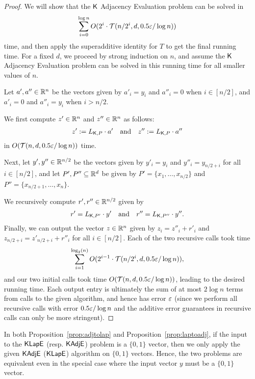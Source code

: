 \begin{proof}
We will show that the $\mathsf{K}$ Adjacency Evaluation problem can be solved in 
\begin{align*}
\sum_{i=0}^{\log n} O(2^i \cdot \mathcal{T}(n/2^i,d,0.5 \varepsilon/\log n))
\end{align*}
time, and then apply the superadditive identity for $T$ to get the final running time.
For a fixed $d$, we proceed by strong induction on $n$, and assume the $\mathsf{K}$ Adjacency Evaluation problem can be solved in this running time for all smaller values of $n$.

Let $a', a'' \in {\mathbb R}^n$ be the vectors given by $a'_i = y_i$ and $a''_i = 0$ when $i \in [n/2]$, and $a'_i = 0$ and $a''_i = y_i$ when $i > n/2$. 

We first compute $z' \in {\mathbb R}^n$ and $z'' \in {\mathbb R}^n$ as follows:
\begin{align*}
 z' := L_{\mathsf{K},P} \cdot a' \text{~~~and~~~}z'' := L_{\mathsf{K},P} \cdot a''
\end{align*} 
in $O( \mathcal{T}(n,d,0.5 \varepsilon/\log n))$ time. 

Next, let $y', y'' \in {\mathbb R}^{n/2}$ be the vectors given by $y'_i = y_i$ and $y''_i = y_{n/2 + i}$ for all $i \in [n/2]$, and let $P', P'' \subseteq {\mathbb R}^d$ be given by $P' = \{ x_1, \ldots, x_{n/2}\}$ and $P'' = \{x_{n/2 + 1}, \ldots, x_n \}$. 

We recursively compute $r', r'' \in {\mathbb R}^{n/2}$ given by 
\begin{align*}
r' = L_{\mathsf{K}, P'} \cdot y' \text{~~~and~~~} r'' = L_{\mathsf{K}, P''} \cdot y''.
\end{align*}
Finally, we can output the vector $z \in {\mathbb R}^n$ given by $z_i = z''_i + r'_i$ and $z_{n/2 + i} = z'_{n/2 + i} + r''_i$ for all $i \in [n/2]$. Each of the two recursive calls took time 
\begin{align*}
\sum_{i=1}^{\log_2(n)} O(2^{i-1} \cdot \mathcal{T}(n/2^i,d,0.5 \varepsilon/\log n)),
\end{align*}
and our two initial calls took time $O( \mathcal{T}(n,d,0.5 \varepsilon/\log n))$, leading to the desired running time. Each output entry is ultimately the sum of at most $2 \log n$ terms from calls to the given algorithm, and hence has error $\varepsilon$ (since we perform all recursive calls with error $0.5 \varepsilon / \log n$ and the additive error guarantees in recursive calls can only be more stringent).
\end{proof}

\begin{remark} \label{rem:equivzeroone}
In both Proposition~\ref{prop:adjtolap} and Proposition~\ref{prop:laptoadj}, if the input to the $\mathsf{KLapE}$ (resp. $\mathsf{KAdjE}$) problem is a $\{0,1\}$ vector, then we only apply the given $\mathsf{KAdjE}$ ($\mathsf{KLapE}$) algorithm on $\{0,1\}$ vectors. Hence, the two problems are equivalent even in the special case where the input vector $y$ must be a $\{0,1\}$ vector.
\end{remark}




